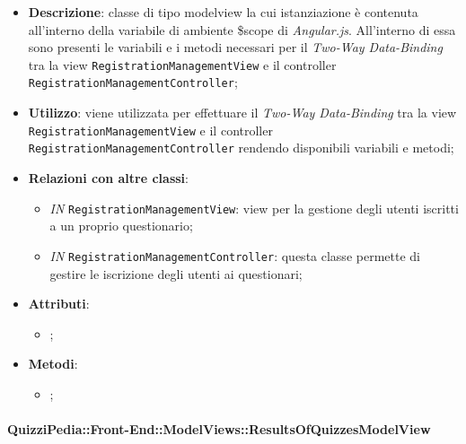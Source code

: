 	\begin{itemize}
		\item \textbf{Descrizione}: classe di tipo modelview la cui istanziazione è contenuta all'interno della variabile di ambiente \$scope di \textit{Angular.js}. All'interno di essa sono presenti le variabili e i metodi necessari per il \textit{Two-Way Data-Binding} tra la view \texttt{RegistrationManagementView} e il controller \texttt{RegistrationManagementController};
		\item \textbf{Utilizzo}: viene utilizzata per effettuare il \textit{Two-Way Data-Binding} tra la view \texttt{RegistrationManagementView} e il controller \texttt{RegistrationManagementController} rendendo disponibili variabili e metodi;
		\item \textbf{Relazioni con altre classi}: 
		\begin{itemize}
			\item \textit{IN} \texttt{RegistrationManagementView}: view per la gestione degli utenti iscritti a un proprio questionario; 
			\item \textit{IN} \texttt{RegistrationManagementController}: questa classe permette di gestire le iscrizione degli utenti ai questionari;
		\end{itemize}
		\item \textbf{Attributi}: 
		\begin{itemize}
			\item ;
		\end{itemize}
		\item \textbf{Metodi}: 
		\begin{itemize}
			\item ;
		\end{itemize}
	\end{itemize}
	
	\paragraph{QuizziPedia::Front-End::ModelViews::ResultsOfQuizzesModelView}
	
	\label{QuizziPedia::Front-End::ModelViews::ResultsOfQuizzesModelView}
	
